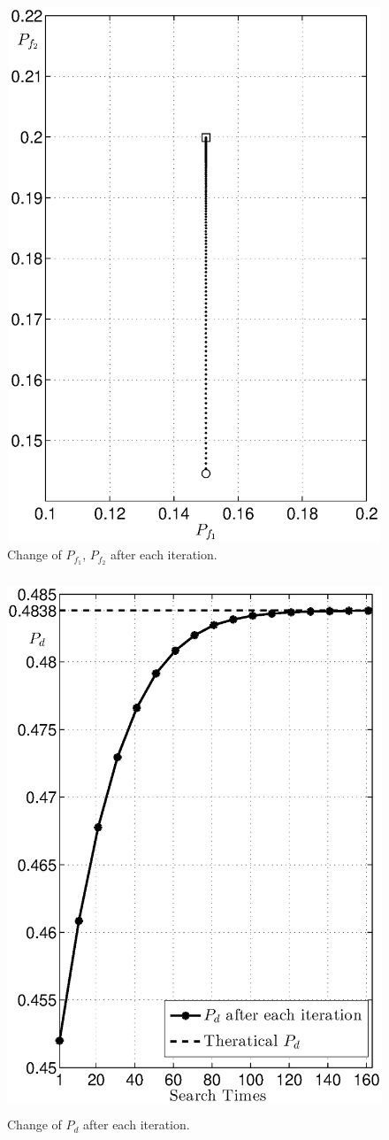 \begin{figure}[H]
\centering
\includegraphics[width = 12cm, height = 16cm]{2/152pf.eps}
\caption{Change of $P_{f_1}$, $P_{f_2}$ after each iteration.}
\label{fig: 2.3}
\end{figure}
\newpage
\begin{figure}[H]
\centering
\includegraphics[width = 12cm,  height = 16cm]{2/152pd.eps}
\caption{Change of $P_d$ after each iteration.}
\label{fig: 2.2}
\end{figure}
